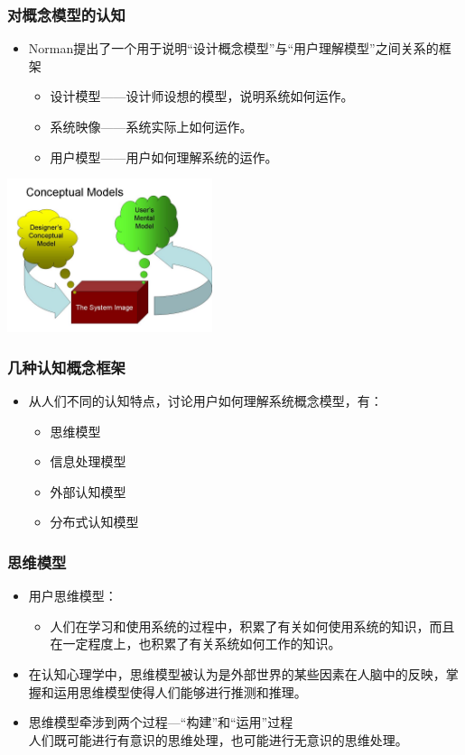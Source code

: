 \documentclass{beamer}
\begin{document}
\begin{frame}
	\frametitle{对概念模型的认知}
	\begin{itemize}
		\item Norman提出了一个用于说明“设计概念模型”与“用户理解模型”之间关系的框架~\cite{norman1988psychology, norman2002design}
		\begin{itemize}
			\item 设计模型——设计师设想的模型，说明系统如何运作。
			\item 系统映像——系统实际上如何运作。
			\item 用户模型——用户如何理解系统的运作。
		\end{itemize}
	\end{itemize}
	\begin{center}
		\includegraphics[width=6cm]{images/norman_model.jpg}
	\end{center}
\end{frame}

\begin{frame}
	\frametitle{几种认知概念框架}
	\begin{itemize}
		\item 从人们不同的认知特点，讨论用户如何理解系统概念模型，有：
		\begin{itemize}
			\item 思维模型
			\item 信息处理模型
			\item 外部认知模型
			\item 分布式认知模型
		\end{itemize}
	\end{itemize}
\end{frame}

\begin{frame}
	\frametitle{思维模型}
	\begin{itemize}
		\item 用户思维模型：
		\begin{itemize}
			\item 人们在学习和使用系统的过程中，积累了有关如何使用系统的知识，而且在一定程度上，也积累了有关系统如何工作的知识。
		\end{itemize}
		\item 在认知心理学中，思维模型被认为是外部世界的某些因素在人脑中的反映，掌握和运用思维模型使得人们能够进行推测和推理。
		\item 思维模型牵涉到两个过程—“构建”和“运用”过程\\{\tiny 人们既可能进行有意识的思维处理，也可能进行无意识的思维处理。}
	\end{itemize}
\end{frame}
\end{document}
